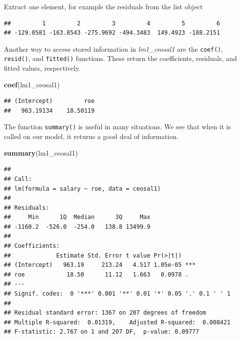 \documentclass[]{book}
\newenvironment{Shaded}{\begin{snugshade}}{\end{snugshade}}
\newcommand{\CommentTok}[1]{\textcolor[rgb]{0.56,0.35,0.01}{\textit{#1}}}
\newcommand{\KeywordTok}[1]{\textcolor[rgb]{0.13,0.29,0.53}{\textbf{#1}}}
\newcommand{\NormalTok}[1]{#1}
\newcommand{\OperatorTok}[1]{\textcolor[rgb]{0.81,0.36,0.00}{\textbf{#1}}}
\begin{document}
Extract one element, for example the residuals from the list object

\begin{Shaded}
\end{Shaded}

\begin{verbatim}
##         1         2         3         4         5         6 
## -129.0581 -163.8543 -275.9692 -494.3483  149.4923 -188.2151
\end{verbatim}

Another way to access stored information in \emph{lm1\_ceosal1} are the
\texttt{coef()}, \texttt{resid()}, and \texttt{fitted()} functions.
These return the coefficients, residuals, and fitted values,
respectively.

\begin{Shaded}
\begin{Highlighting}[]
\KeywordTok{coef}\NormalTok{(lm1_ceosal1)}
\end{Highlighting}
\end{Shaded}

\begin{verbatim}
## (Intercept)         roe 
##   963.19134    18.50119
\end{verbatim}

The function \texttt{summary()} is useful in many situations. We see
that when it is called on our model, it returns a good deal of
information.

\begin{Shaded}
\begin{Highlighting}[]
\KeywordTok{summary}\NormalTok{(lm1_ceosal1)}
\end{Highlighting}
\end{Shaded}

\begin{verbatim}
## 
## Call:
## lm(formula = salary ~ roe, data = ceosal1)
## 
## Residuals:
##     Min      1Q  Median      3Q     Max 
## -1160.2  -526.0  -254.0   138.8 13499.9 
## 
## Coefficients:
##             Estimate Std. Error t value Pr(>|t|)    
## (Intercept)   963.19     213.24   4.517 1.05e-05 ***
## roe            18.50      11.12   1.663   0.0978 .  
## ---
## Signif. codes:  0 '***' 0.001 '**' 0.01 '*' 0.05 '.' 0.1 ' ' 1
## 
## Residual standard error: 1367 on 207 degrees of freedom
## Multiple R-squared:  0.01319,    Adjusted R-squared:  0.008421 
## F-statistic: 2.767 on 1 and 207 DF,  p-value: 0.09777
\end{verbatim}
\end{document}

